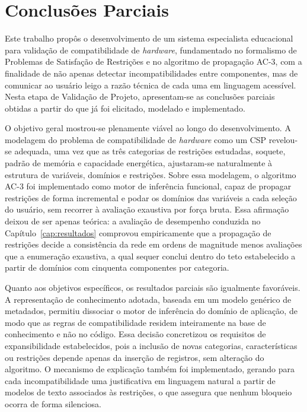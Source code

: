 \chapter{Conclusões Parciais}
\label{cap:12}

Este trabalho propôs o desenvolvimento de um sistema especialista educacional para
validação de compatibilidade de \textit{hardware}, fundamentado no formalismo de Problemas de
Satisfação de Restrições e no algoritmo de propagação AC-3, com a finalidade de não apenas
detectar incompatibilidades entre componentes, mas de comunicar ao usuário leigo a razão
técnica de cada uma em linguagem acessível. Nesta etapa de Validação de Projeto,
apresentam-se as conclusões parciais obtidas a partir do que já foi elicitado, modelado e
implementado.

O objetivo geral mostrou-se plenamente viável ao longo do desenvolvimento. A modelagem do
problema de compatibilidade de \textit{hardware} como um CSP revelou-se adequada, uma vez que as
três categorias de restrições estudadas, soquete, padrão de memória e capacidade
energética, ajustaram-se naturalmente à estrutura de variáveis, domínios e restrições.
Sobre essa modelagem, o algoritmo AC-3 foi implementado como motor de inferência funcional,
capaz de propagar restrições de forma incremental e podar os domínios das variáveis a cada
seleção do usuário, sem recorrer à avaliação exaustiva por força bruta. Essa afirmação
deixou de ser apenas teórica: a avaliação de desempenho conduzida no
Capítulo~\ref{cap:resultados} comprovou empiricamente que a propagação de restrições decide
a consistência da rede em ordens de magnitude menos avaliações que a enumeração exaustiva,
a qual sequer conclui dentro do teto estabelecido a partir de domínios com cinquenta
componentes por categoria.

Quanto aos objetivos específicos, os resultados parciais são igualmente favoráveis. A
representação de conhecimento adotada, baseada em um modelo genérico de metadados, permitiu
dissociar o motor de inferência do domínio de aplicação, de modo que as regras de
compatibilidade residem inteiramente na base de conhecimento e não no código. Essa decisão
concretizou os requisitos de expansibilidade estabelecidos, pois a inclusão de novas
categorias, características ou restrições depende apenas da inserção de registros, sem
alteração do algoritmo. O mecanismo de explicação também foi implementado, gerando para
cada incompatibilidade uma justificativa em linguagem natural a partir de modelos de texto
associados às restrições, o que assegura que nenhum bloqueio ocorra de forma silenciosa.

